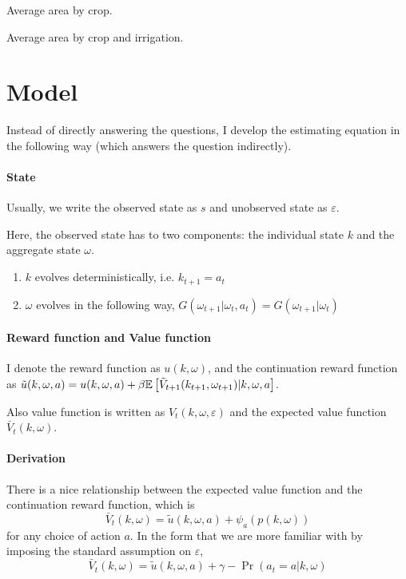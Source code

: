 \documentclass[12pt]{article}[margin=1in]
\begin{document}
\begin{table}
    \centering
    
    \caption{Average area by crop.}
    \label{tab:area_by_crop_avg}
\end{table}

\begin{table}
    \centering
    
    \caption{Average area by crop and irrigation.}
    \label{tab:area_by_crop_irr_avg}
\end{table}


\section{Model}
Instead of directly answering the questions, I develop the estimating equation in the following way (which answers the question indirectly).

\paragraph{State} Usually, we write the observed state as $s$ and unobserved state as $\varepsilon$.

Here, the observed state has to two components: the individual state $k$ and the aggregate state $\omega$. 
\begin{enumerate}
    \item $k$ evolves deterministically, i.e. $k_{t+1} = a_t$
    \item $\omega$ evolves in the following way, $G(\omega_{t+1} | \omega_t, a_t) = G(\omega_{t+1} | \omega_t)$
\end{enumerate}

\paragraph{Reward function and Value function}

I denote the reward function as $u(k, \omega)$, and the continuation reward function as $\tilde{u}(k, \omega,a) = u(k, \omega, a) + \beta \mathbb{E}\left[\tilde{V}_{t+1}(k_{t+1}, \omega_{t+1}) | k, \omega, a\right]$.

Also  value function is written as $V_t(k,\omega, \varepsilon)$ and the expected value function $\bar{V}_t(k,\omega)$. 

\paragraph{Derivation} There is a nice relationship between the expected value function and the continuation reward function, which is
$$ \bar{V}_t(k, \omega) = \tilde{u}(k, \omega, a) + \psi_a(p(k,\omega))$$  for any choice of action $a$.
In the form that we are more familiar with by imposing the standard assumption on $\varepsilon$,
$$ \bar{V}_t(k, \omega) = \tilde{u}(k, \omega, a) + \gamma -\Pr(a_t = a | k, \omega) $$
\end{document}
